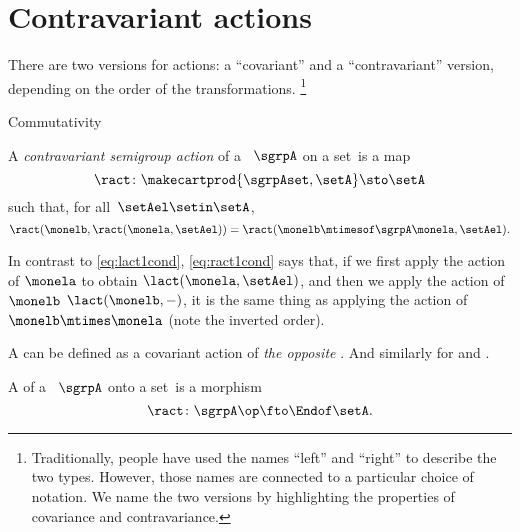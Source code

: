 \section{Contravariant actions}

There are two versions for actions: a ``covariant'' and a ``contravariant'' version, depending on the order of the transformations.
\footnote{
    Traditionally, people have used the names ``left'' and ``right'' to describe the two types.
    However, those names are connected to a particular choice of notation.
    We name the two versions by highlighting the properties of covariance and contravariance.
}

\begin{marginfigure}
    \centering
    \caption{Commutativity}
    \label{fig:semigroup-contrav-action}
\end{marginfigure}
\begin{ctdefinition}
    \label{def:semigroup-contra-action-prelim}
    A \emph{contravariant semigroup action} of a ~$\sgrpA$ on a set~\setA is a map
    \begin{equation}
        \label{eq:ract}
        \ract \colon \makecartprod{\sgrpAset, \setA} \sto \setA
    \end{equation}
    such that, for all~$\setAel \setin \setA$,
    \begin{equation}
        \label{eq:ract1cond}
        \ract(\monelb, \ract(\monela, \setAel)) = \ract(\monelb \mtimesof\sgrpA \monela, \setAel).
    \end{equation}
\end{ctdefinition}

In contrast to \cref{eq:lact1cond}, \cref{eq:ract1cond} says that, if we first apply the action of $\monela$ to obtain $\lact(\monela, \setAel)$,
and then we apply the action of $\monelb$ $\lact(\monelb, -)$, it is the same thing as applying the action of $\monelb\mtimes\monela$ (note the inverted order).

A  can be defined as a covariant action of \emph{the opposite} .
And similarly for  and .

\begin{ctdefinition}
    \label{def:semigroup-cont-action}
    A  of a ~$\sgrpA$ onto a set~\setA is a  morphism
    \begin{equation}
        \ract \colon \sgrpA\op \fto \Endof\setA.
    \end{equation}
\end{ctdefinition}

